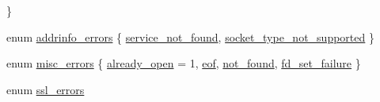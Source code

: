 \begin{DoxyCompactItemize}
 \}
\item 
enum \hyperlink{namespaceasio_1_1error_aad09966951a812a25f9cd9e7d92c2764}{addrinfo\+\_\+errors} \{ \hyperlink{namespaceasio_1_1error_aad09966951a812a25f9cd9e7d92c2764a18af5b8ae0eb91b5f3538fa36f1d398d}{service\+\_\+not\+\_\+found}, 
\hyperlink{namespaceasio_1_1error_aad09966951a812a25f9cd9e7d92c2764a781d78de28182df7809b8e3b4e1d53ec}{socket\+\_\+type\+\_\+not\+\_\+supported}
 \}
\item 
enum \hyperlink{namespaceasio_1_1error_ade61a402d1dfb10b1c223906f5ea7847}{misc\+\_\+errors} \{ \hyperlink{namespaceasio_1_1error_ade61a402d1dfb10b1c223906f5ea7847ab57843ad5fc4f314afebfa76cedff29e}{already\+\_\+open} = 1, 
\hyperlink{namespaceasio_1_1error_ade61a402d1dfb10b1c223906f5ea7847abb0b3b47deff67dd67b180d9d1e34154}{eof}, 
\hyperlink{namespaceasio_1_1error_ade61a402d1dfb10b1c223906f5ea7847a6cfdfb1e108e927e2bfc847850ba0dcb}{not\+\_\+found}, 
\hyperlink{namespaceasio_1_1error_ade61a402d1dfb10b1c223906f5ea7847a75104dfe4e0804fdee643db012130ca0}{fd\+\_\+set\+\_\+failure}
 \}
\item 
enum \hyperlink{namespaceasio_1_1error_a2f5ce38329dc0833d602aa313da3df7a}{ssl\+\_\+errors} 
\end{DoxyCompactItemize}
